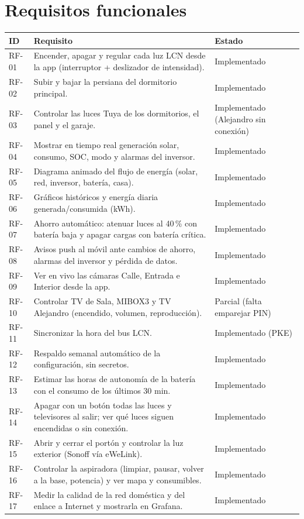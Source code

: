 \documentclass[11pt,a4paper]{report}
\begin{document}
\section{Requisitos funcionales}
\begin{longtable}{@{}p{1.3cm}p{10.2cm}p{3.3cm}@{}}
\toprule
\textbf{ID} & \textbf{Requisito} & \textbf{Estado}\\\midrule\endhead
RF-01 & Encender, apagar y regular cada luz LCN desde la app (interruptor + deslizador de intensidad). & Implementado\\
RF-02 & Subir y bajar la persiana del dormitorio principal. & Implementado\\
RF-03 & Controlar las luces Tuya de los dormitorios, el panel y el garaje. & Implementado (Alejandro sin conexión)\\
RF-04 & Mostrar en tiempo real generación solar, consumo, SOC, modo y alarmas del inversor. & Implementado\\
RF-05 & Diagrama animado del flujo de energía (solar, red, inversor, batería, casa). & Implementado\\
RF-06 & Gráficos históricos y energía diaria generada/consumida (kWh). & Implementado\\
RF-07 & Ahorro automático: atenuar luces al 40\,\% con batería baja y apagar cargas con batería crítica. & Implementado\\
RF-08 & Avisos push al móvil ante cambios de ahorro, alarmas del inversor y pérdida de datos. & Implementado\\
RF-09 & Ver en vivo las cámaras Calle, Entrada e Interior desde la app. & Implementado\\
RF-10 & Controlar TV de Sala, MIBOX3 y TV Alejandro (encendido, volumen, reproducción). & Parcial (falta emparejar PIN)\\
RF-11 & Sincronizar la hora del bus LCN. & Implementado (PKE)\\
RF-12 & Respaldo semanal automático de la configuración, sin secretos. & Implementado\\
RF-13 & Estimar las horas de autonomía de la batería con el consumo de los últimos 30 min. & Implementado\\
RF-14 & Apagar con un botón todas las luces y televisores al salir; ver qué luces siguen encendidas o sin conexión. & Implementado\\
RF-15 & Abrir y cerrar el portón y controlar la luz exterior (Sonoff vía eWeLink). & Implementado\\
RF-16 & Controlar la aspiradora (limpiar, pausar, volver a la base, potencia) y ver mapa y consumibles. & Implementado\\
RF-17 & Medir la calidad de la red doméstica y del enlace a Internet y mostrarla en Grafana. & Implementado\\
\bottomrule
\end{longtable}
\end{document}
